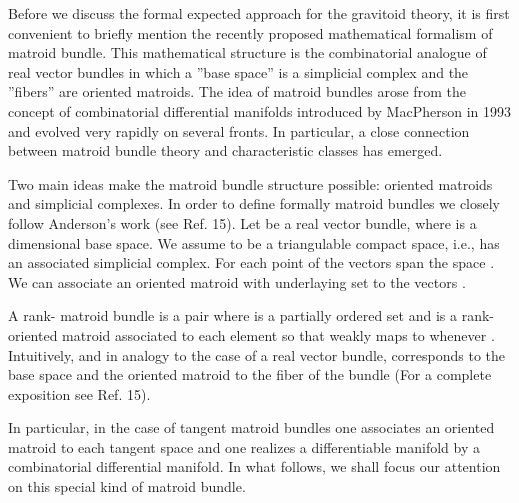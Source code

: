 \documentclass[a4paper,12pt]{article}
\begin{document}
Before we discuss the formal expected approach for the gravitoid theory, it
is first convenient to briefly mention the recently proposed mathematical
formalism of matroid bundle. This mathematical structure is the
combinatorial analogue of real vector bundles in which a ''base space'' is a
simplicial complex and the ''fibers'' are oriented matroids. The idea of
matroid bundles arose from the concept of combinatorial differential
manifolds introduced by MacPherson\coordHE{} in 1993 and evolved very rapidly
on several fronts. In particular, a close connection between matroid bundle
theory and characteristic classes has emerged.\coordHE{}

Two main ideas make the matroid bundle structure possible: oriented matroids
and simplicial complexes. In order to define formally matroid bundles we
closely follow Anderson's work (see Ref. 15). Let \coordHE{} be a real vector bundle, where \coordHE{} is a \coordHE{}dimensional base
space. We assume \coordHE{} to be a triangulable compact space, i.e., \coordHE{} has an
associated simplicial complex. For each point \coordHE{} of \coordHE{} the vectors \coordHE{} span the space \coordHE{}. We can associate
an oriented matroid with underlaying set \coordHE{} to the vectors \coordHE{}.

A rank-\coordHE{} matroid bundle is a pair \coordHE{} where \coordHE{} is a
partially ordered set and \coordHE{} is a rank-\coordHE{} oriented matroid
associated to each element \coordHE{} so that \coordHE{} weakly maps to \coordHE{} whenever \coordHE{}. Intuitively, and
in analogy to the case of a real vector bundle, \coordHE{} corresponds to the
base space \coordHE{} and the oriented matroid \coordHE{} to the fiber of the
bundle \coordHE{} (For a complete exposition see Ref. 15).

In particular, in the case of tangent matroid bundles one associates an
oriented matroid to each tangent space and one realizes a differentiable
manifold by a combinatorial differential manifold. In what follows, we shall
focus our attention on this special kind of matroid bundle.
\end{document}
